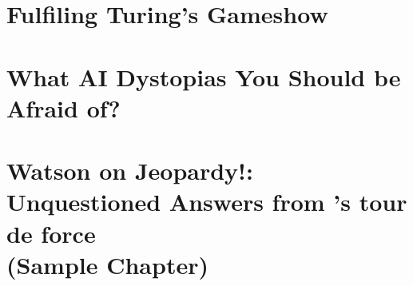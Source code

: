 \documentclass[bfivepaper,twosided,justified,nobib]{style/tufte-book}
\newif\ifproposal\proposaltrue
\newcommand{\proposalpart}[2]{
  \ifproposal
  \else
  \part{#1}
  \fi
}
\newcommand{\chapterfile}[3]{
  \ifproposal
      \begingroup
      \renewcommand{\cleardoublepage}{}
      \renewcommand{\clearpage}{}
      \chapter{#3}\label{ch:#2}
      \endgroup
      \vspace{-0.5cm}
      
      \vspace{-2.5cm}
  \else
      \chapter{#3}
      \label{ch:#2}
      \begin{quote}
        
      \end{quote} 
      
  \fi}
\begin{document}






\proposalpart{Question Answering Future}{3}

\chapterfile{300}{gameshow}{Fulfiling Turing's Gameshow}

\chapterfile{310}{scifi}{What AI Dystopias You Should be Afraid of?}






\ifproposal

\titleformat{\chapter}[display]
{\normalfont%
    \huge%
    \bfseries}{\chaptertitlename\ \thechapter}{20pt}{%
    \Huge %
    }
  \setcounter{chapter}{5}
  \chapter{Watson on Jeopardy!: \\ Unquestioned Answers from 's tour
    de force \\ (Sample Chapter)}
  
  \begin{quote}
    
  \end{quote}
  
  
\fi

\backmatter





\printindex
\end{document}
